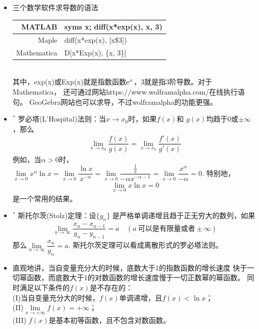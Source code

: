 \begin{itemize}[leftmargin=\inteval{\myitemleftmargin}pt,itemsep=
   \inteval{\myitemitempsep}pt,topsep=\inteval{\myitemtopsep}pt]
\item 三个数学软件求导数的语法 
\begin{table}[!htbp]
    \centering
    \begin{tabular}{|r|l|}
        \hline
        MATLAB & syms x; diff(x*exp(x), x, 3) \\ \hline
        Maple & diff(x*exp(x), [x\$3]) \\ \hline
        Mathematica & D[x*Exp(x), \{x, 3\}] \\ \hline
    \end{tabular}
\end{table} \\
其中，exp(x)或Exp(x)就是指数函数$ \mathrm{e}^x $，3就是指3阶导数。对于Mathematica，
还可通过网站https://www.wolframalpha.com/在线执行语句。
GeoGebra网站也可以求导，不过wolframalpha的功能更强。 

\item $^*$ 罗必塔(L'Hospital)法则：当$ x\to x_0 $时，如果$ f(x) $和
$ g(x) $均趋于0或$ \pm \infty $，那么
\begin{gather}\label{罗必塔法则}
   \lim\limits_{x\to x_0}\dfrac{f(x)}{g(x)}=
   \lim\limits_{x\to x_0}\dfrac{f'(x)}{g'(x)}
\end{gather}
例如，当$ \alpha >0 $时，$ \lim\limits_{x\to 0}x^{\alpha}\ln x=\lim\limits_{x\to 0}
\dfrac{\ln x}{x^{-\alpha}}=\lim\limits_{x\to 0}\dfrac{\frac{1}{x}}{-\alpha x^{-\alpha -1}}=\lim\limits_{x\to 0}\dfrac{x^{\alpha}}{-\alpha}=0 $. 
特别地，
\begin{gather}\label{limit_xlnx=0}
	\lim\limits_{x\to 0} x\ln x=0 
\end{gather}
是一个常用的结果。

\item $^*$ 斯托尔茨(Stolz)定理：设$ \{y_n \} $
是严格单调递增且趋于正无穷大的数列，如果
\begin{gather*}
    \lim\limits_{n\to\infty}\dfrac{x_n-x_{n-1}}{y_n-y_{n-1}}=a \quad 
    (a\ \text{可以是有限量或者} \pm \infty) 
\end{gather*}
那么$ \lim\limits_{n\to\infty}\dfrac{x_n}{y_n}=a $. 
斯托尔茨定理可以看成离散形式的罗必塔法则。

\item 直观地讲，当自变量充分大的时候，底数大于1的指数函数的增长速度
快于一切幂函数，而底数大于1的对数函数的增长速度慢于一切正数幂的幂函数。
同时满足以下条件的$ f(x) $是不存在的：\\
(I)当自变量充分大的时候，$  f(x) $单调递增，且$ f(x)<\ln x $；\\
(II)$ \lim\limits_{x\to+\infty}f(x)=+\infty $；\\
(III) $ f(x) $是基本初等函数，且不包含对数函数。


\end{itemize}
